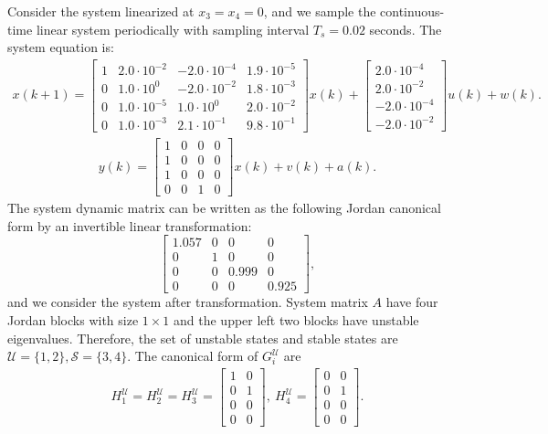 \documentclass[12pt]{article}  %
\newcommand{\Uc}{{\mathcal{U}}}
\newcommand{\Sc}{{\mathcal{S}}}
\begin{document}
Consider the system linearized at $x_3=x_4=0$, and we sample the continuous-time linear system periodically with sampling interval $T_s=0.02$ seconds. 
The system equation is:
\begin{align*}
x(k+1)=\begin{bmatrix}
1  &   2.0\cdot 10^{-2}  &  -2.0\cdot 10^{-4}  &  1.9\cdot 10^{-5}\\
0  &   1.0\cdot 10^{0}   & -2.0\cdot 10^{-2}  &   1.8\cdot 10^{-3}\\
0  &   1.0\cdot 10^{-5} &   1.0\cdot 10^{0} &   2.0\cdot 10^{-2}\\
0  &   1.0\cdot 10^{-3}&  2.1\cdot 10^{-1}  &  9.8\cdot 10^{-1}
\end{bmatrix}x(k)+\begin{bmatrix}
2.0\cdot 10^{-4}\\
2.0\cdot 10^{-2}\\
-2.0\cdot 10^{-4}\\
-2.0\cdot 10^{-2}
\end{bmatrix}
u(k)+w(k).
\end{align*}
\begin{align*}
y(k)=
\begin{bmatrix}
1& 0 &0 &0\\
1& 0 &0 &0\\
1& 0 &0 &0\\
0& 0 &1 &0
\end{bmatrix}x(k)+v(k)+a(k).
\end{align*}
The system dynamic matrix can be written as the following Jordan canonical form by an invertible linear transformation:
$$
\begin{bmatrix}
1.057 & 0 &  0 & 0\\
0  & 1 & 0 &  0\\
0  & 0 & 0.999 & 0  \\
0  & 0 & 0 &  0.925 
\end{bmatrix},
$$
and we consider the system after transformation. System matrix $A$ have four Jordan blocks with size $1\times1$ and the upper left two blocks have unstable eigenvalues. Therefore, the set of unstable states and stable states are $\Uc=\{1,2\},\Sc=\{3,4\}.$
The canonical form of $G_i^\Uc$ are 
\begin{align}
H_1^\Uc=H_2^\Uc=H_3^\Uc=\begin{bmatrix}
1 & 0 \\
0  & 1 \\
0  & 0   \\
0  & 0 
\end{bmatrix},\ H_4^\Uc=\begin{bmatrix}
0 & 0 \\
0  & 1 \\
0  & 0   \\
0  & 0 
\end{bmatrix}.
\end{align}
\end{document}
